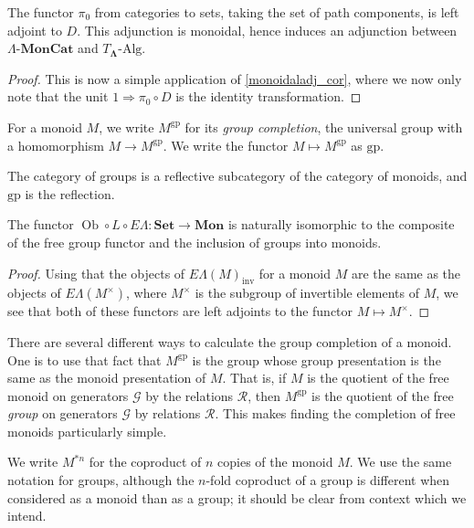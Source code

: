 \documentclass{amsbook} %
\newcommand{\mb}{\mathbf}
\newcommand{\Set}{\mb{Set}}
\newcommand{\ML}{\mathbf{\Lambda}}
\newcommand{\EL}{E\Lambda}
\newcommand{\ob}{\operatorname{Ob}}
\newcommand{\lmc}{\Lambda\mbox{-}\mb{MonCat}}
\newcommand{\sets}{\Set}
\newcommand{\mon}{\ensuremath{\mb{Mon}}}
\newcommand{\gp}{\mathrm{gp}}
\numberwithin{section}{chapter}
\begin{document}
\begin{prop}\label{pi0-D_adj}
The functor $\pi_0$ from categories to sets, taking the set of path components, is left adjoint to  $D$. This adjunction is monoidal, hence induces an adjunction between $\lmc$ and $T_{\ML}\mbox{-}\textrm{Alg}$.
\end{prop}
\begin{proof}
This is now a simple application of \cref{monoidaladj_cor}, where we now only note that the unit $1 \Rightarrow \pi_0 \circ D$ is the identity transformation.
\end{proof}



\begin{Defi} For a monoid $M$, we write $M^{\gp}$ for its \emph{group completion}, the universal group with a homomorphism $M \rightarrow M^{\gp}$.  We write the functor $M \mapsto M^{\gp}$ as $\gp$.
\end{Defi}

\begin{rem}
The category of groups is a reflective subcategory of the category of monoids, and $\gp$ is the reflection.
\end{rem}

\begin{prop}\label{oblel_fg}
The functor $\ob \circ L \circ \EL \colon  \sets \rightarrow \mon$ is naturally isomorphic to the composite of the free group functor and the inclusion of groups into monoids.
\end{prop}
\begin{proof}
Using that the objects of $\EL(M)_{\mathrm{inv}}$ for a monoid $M$ are the same as the objects of $\EL(M^{\times})$, where $M^{\times}$ is the subgroup of invertible elements of $M$, we see that both of these functors are left adjoints to the functor $M \mapsto M^{\times}$.
\end{proof}
There are several different ways to calculate the group completion of a monoid. One is to use that fact that $M^{\gp}$ is the group whose group presentation is the same as the monoid presentation of $M$. That is, if $M$ is the quotient of the free monoid on generators $\mathcal{G}$ by the relations $\mathcal{R}$, then $M^{\gp}$ is the quotient of the free \emph{group} on generators $\mathcal{G}$ by relations $\mathcal{R}$. This makes finding the completion of free monoids particularly simple.

\begin{nota}
We write $M^{*n}$ for the coproduct of $n$ copies of the monoid $M$. We use the same notation for groups, although the $n$-fold coproduct of a group is different when considered as a monoid than as a group; it should be clear from context which we intend.
\end{nota}
\end{document}

